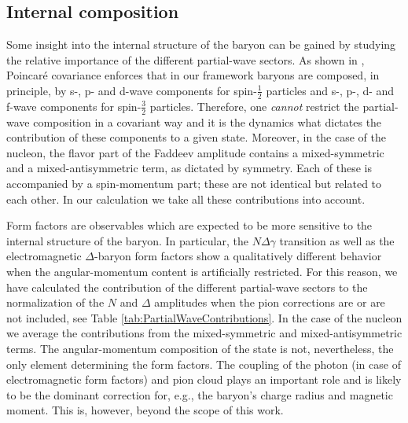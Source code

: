 \subsection*{Internal composition}\label{subsec:internal_composition}

Some insight into the internal structure of the baryon can be gained by 
studying the relative importance of the different partial-wave sectors. 
As shown in \cite{Eichmann:2009qa,Eichmann:2009en,SanchisAlepuz:2011jn}, 
Poincar\'e covariance enforces that in our framework baryons are composed, 
in principle, by s-, p- and d-wave components for spin-$\frac{1}{2}$ 
particles and s-, p-, d- and f-wave components for spin-$\frac{3}{2}$
particles. Therefore, one \textit{cannot} restrict the partial-wave 
composition in a covariant way and it is the dynamics what 
dictates the contribution of these components to a given state. Moreover, 
in the case of the nucleon, the flavor part of the Faddeev amplitude contains 
a mixed-symmetric and a mixed-antisymmetric term, as dictated by symmetry. 
Each of these is accompanied by a spin-momentum part; these are not identical
but related to each other. In our calculation we take all these contributions
into account. 

Form factors are observables which are expected to be more sensitive to the internal structure of the baryon. In particular, the $N\Delta\gamma$ transition \cite{Eichmann:2011aa,NDg} as well as the electromagnetic $\Delta$-baryon form factors \cite{Sanchis-Alepuz:2013iia} show a qualitatively different behavior when the angular-momentum content is artificially restricted. For this reason, we have calculated the contribution of the different partial-wave sectors to the normalization of the $N$ and $\Delta$ amplitudes when the pion corrections are or are not included, see Table \ref{tab:PartialWaveContributions}. In the case of the nucleon we average the contributions from the mixed-symmetric and mixed-antisymmetric terms. The angular-momentum composition of the state is not, nevertheless, the only element determining the form factors. The coupling of the photon (in case of electromagnetic form factors) and pion cloud plays an important role and is likely to be the dominant correction for, e.g., the baryon's charge radius and magnetic moment. This is, however, beyond the scope of this work.

